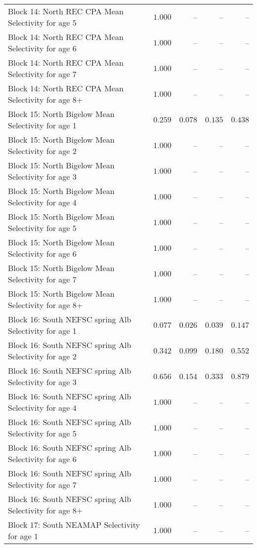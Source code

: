 \documentclass[
]{article}
\begin{document}
\begin{landscape}
\begin{longtable}[t]{lrrrr}
\addlinespace
Block 14: North REC CPA Mean Selectivity for age 5 & $1.000$ & -- & -- & --\\
Block 14: North REC CPA Mean Selectivity for age 6 & $1.000$ & -- & -- & --\\
Block 14: North REC CPA Mean Selectivity for age 7 & $1.000$ & -- & -- & --\\
Block 14: North REC CPA Mean Selectivity for age 8+ & $1.000$ & -- & -- & --\\
Block 15: North Bigelow Mean Selectivity for age 1 & $0.259$ & $0.078$ & $0.135$ & $0.438$\\
\addlinespace
Block 15: North Bigelow Mean Selectivity for age 2 & $1.000$ & -- & -- & --\\
Block 15: North Bigelow Mean Selectivity for age 3 & $1.000$ & -- & -- & --\\
Block 15: North Bigelow Mean Selectivity for age 4 & $1.000$ & -- & -- & --\\
Block 15: North Bigelow Mean Selectivity for age 5 & $1.000$ & -- & -- & --\\
Block 15: North Bigelow Mean Selectivity for age 6 & $1.000$ & -- & -- & --\\
\addlinespace
Block 15: North Bigelow Mean Selectivity for age 7 & $1.000$ & -- & -- & --\\
Block 15: North Bigelow Mean Selectivity for age 8+ & $1.000$ & -- & -- & --\\
Block 16: South NEFSC spring Alb Selectivity for age 1 & $0.077$ & $0.026$ & $0.039$ & $0.147$\\
Block 16: South NEFSC spring Alb Selectivity for age 2 & $0.342$ & $0.099$ & $0.180$ & $0.552$\\
Block 16: South NEFSC spring Alb Selectivity for age 3 & $0.656$ & $0.154$ & $0.333$ & $0.879$\\
\addlinespace
Block 16: South NEFSC spring Alb Selectivity for age 4 & $1.000$ & -- & -- & --\\
Block 16: South NEFSC spring Alb Selectivity for age 5 & $1.000$ & -- & -- & --\\
Block 16: South NEFSC spring Alb Selectivity for age 6 & $1.000$ & -- & -- & --\\
Block 16: South NEFSC spring Alb Selectivity for age 7 & $1.000$ & -- & -- & --\\
Block 16: South NEFSC spring Alb Selectivity for age 8+ & $1.000$ & -- & -- & --\\
\addlinespace
Block 17: South NEAMAP Selectivity for age 1 & $1.000$ & -- & -- & --\\

\end{longtable}
\end{landscape}
\end{document}
